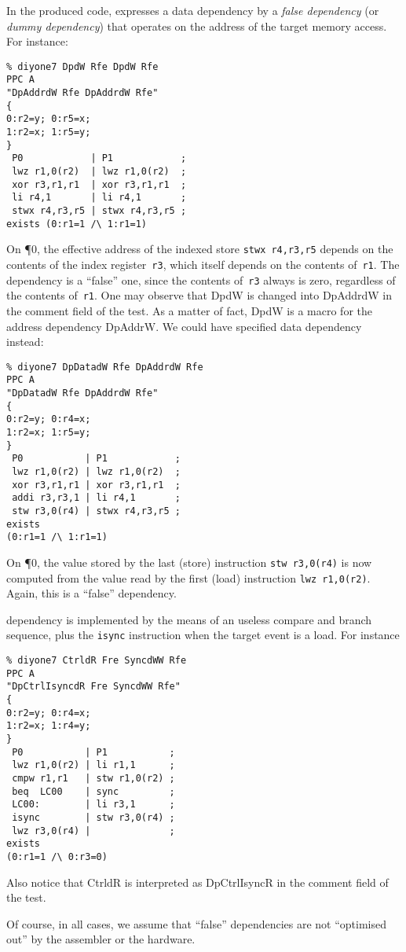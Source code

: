 In the produced code, \diy{} expresses
a data dependency by a \emph{false dependency} (or \emph{dummy dependency})
that operates on the address of the target memory access.
For instance:
\begin{verbatim}
% diyone7 DpdW Rfe DpdW Rfe
PPC A
"DpAddrdW Rfe DpAddrdW Rfe"
{
0:r2=y; 0:r5=x;
1:r2=x; 1:r5=y;
}
 P0            | P1            ;
 lwz r1,0(r2)  | lwz r1,0(r2)  ;
 xor r3,r1,r1  | xor r3,r1,r1  ;
 li r4,1       | li r4,1       ;
 stwx r4,r3,r5 | stwx r4,r3,r5 ;
exists (0:r1=1 /\ 1:r1=1)
\end{verbatim}
On \P{0}, the effective address of the indexed store \verb+stwx r4,r3,r5+
depends on the contents of the index register~\verb+r3+, which itself
depends on the contents of~\verb+r1+.
The dependency is a ``false'' one, since the contents of~\verb+r3+
always is zero, regardless of the contents of~\verb+r1+.
One may observe that DpdW is changed into DpAddrdW in the comment
field of the test.
As a matter of fact, DpdW is a macro for the address dependency
DpAddrW. We could have specified data dependency instead:
\begin{verbatim}
% diyone7 DpDatadW Rfe DpAddrdW Rfe
PPC A
"DpDatadW Rfe DpAddrdW Rfe"
{
0:r2=y; 0:r4=x;
1:r2=x; 1:r5=y;
}
 P0           | P1            ;
 lwz r1,0(r2) | lwz r1,0(r2)  ;
 xor r3,r1,r1 | xor r3,r1,r1  ;
 addi r3,r3,1 | li r4,1       ;
 stw r3,0(r4) | stwx r4,r3,r5 ;
exists
(0:r1=1 /\ 1:r1=1)
\end{verbatim}
On \P{0}, the value stored by the last (store) instruction
\verb+stw r3,0(r4)+ is now computed from the
value read by the first (load) instruction \verb+lwz r1,0(r2)+.
Again, this is a ``false'' dependency.

dependency is implemented by the means of an useless compare
and branch sequence, plus the \texttt{isync} instruction when the target event
is a load. For instance
\begin{verbatim}
% diyone7 CtrldR Fre SyncdWW Rfe
PPC A
"DpCtrlIsyncdR Fre SyncdWW Rfe"
{
0:r2=y; 0:r4=x;
1:r2=x; 1:r4=y;
}
 P0           | P1           ;
 lwz r1,0(r2) | li r1,1      ;
 cmpw r1,r1   | stw r1,0(r2) ;
 beq  LC00    | sync         ;
 LC00:        | li r3,1      ;
 isync        | stw r3,0(r4) ;
 lwz r3,0(r4) |              ;
exists
(0:r1=1 /\ 0:r3=0)
\end{verbatim}
Also notice that CtrldR is interpreted as DpCtrlIsyncR in the comment
field of the test.

Of course, in all cases, we assume that ``false'' dependencies are not
``optimised out'' by the assembler or the hardware.

